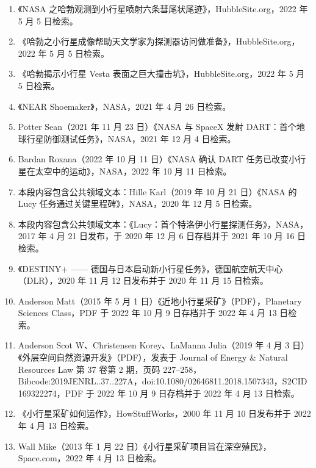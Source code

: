 \begin{enumerate}
\item 《NASA 之哈勃观测到小行星喷射六条彗尾状尾迹》，HubbleSite.org，2022 年 5 月 5 日检索。

\item 《哈勃之小行星成像帮助天文学家为探测器访问做准备》，HubbleSite.org，2022 年 5 月 5 日检索。

\item 《哈勃揭示小行星 Vesta 表面之巨大撞击坑》，HubbleSite.org，2022 年 5 月 5 日检索。

\item 《NEAR Shoemaker》，NASA，2021 年 4 月 26 日检索。

\item Potter Sean（2021 年 11 月 23 日）《NASA 与 SpaceX 发射 DART：首个地球行星防御测试任务》，NASA，2021 年 12 月 4 日检索。

\item Bardan Roxana（2022 年 10 月 11 日）《NASA 确认 DART 任务已改变小行星在太空中的运动》，NASA，2022 年 10 月 11 日检索。

\item 本段内容包含公共领域文本：Hille Karl（2019 年 10 月 21 日）《NASA 的 Lucy 任务通过关键里程碑》，NASA，2020 年 12 月 5 日检索。

\item 本段内容包含公共领域文本：《Lucy：首个特洛伊小行星探测任务》，NASA，2017 年 4 月 21 日发布，于 2020 年 12 月 6 日存档并于 2021 年 10 月 16 日检索。

\item 《DESTINY+ —— 德国与日本启动新小行星任务》，德国航空航天中心（DLR），2020 年 11 月 12 日发布并于 2020 年 11 月 15 日检索。

\item Anderson Matt（2015 年 5 月 1 日）《近地小行星采矿》（PDF），Planetary Sciences Class，PDF 于 2022 年 10 月 9 日存档并于 2022 年 4 月 13 日检索。

\item Anderson Scot W、Christensen Korey、LaManna Julia（2019 年 4 月 3 日）《外层空间自然资源开发》（PDF），发表于 Journal of Energy & Natural Resources Law 第 37 卷第 2 期，页码 227–258，Bibcode:2019JENRL..37..227A，doi:10.1080/02646811.2018.1507343，S2CID 169322274，PDF 于 2022 年 10 月 9 日存档并于 2022 年 4 月 13 日检索。

\item 《小行星采矿如何运作》，HowStuffWorks，2000 年 11 月 10 日发布并于 2022 年 4 月 13 日检索。

\item Wall Mike（2013 年 1 月 22 日）《小行星采矿项目旨在深空殖民》，Space.com，2022 年 4 月 13 日检索。


\end{enumerate}
